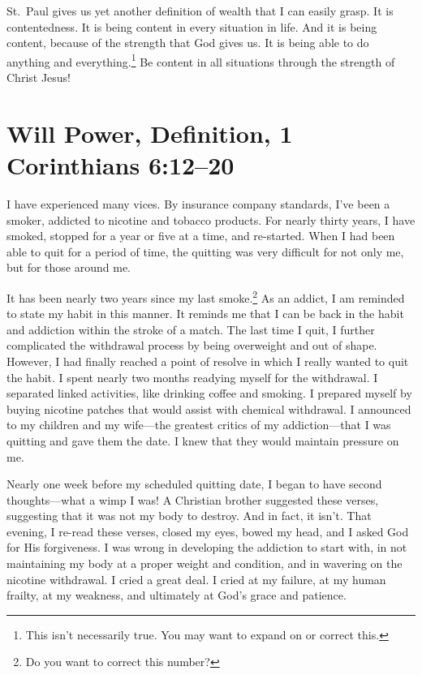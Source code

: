 \documentclass[12pt]{memoir}
\begin{document}
St.~Paul gives us yet another definition of wealth that I can easily
grasp. It is contentedness. It is being content in every situation
in life. And it is being content, because of the strength that God
gives us. It is being able to do anything and everything.\footnote{This isn't necessarily true. You may want to expand on or correct this.} Be content in all situations through the strength of Christ Jesus!

\section[Will Power]{Will Power, Definition, 1 Corinthians 6:12--20}

I have experienced many vices. By insurance company standards, I've
been a smoker, addicted to nicotine and tobacco products. For nearly
thirty years, I have smoked, stopped for a year or five at a time,
and re-started. When I had been able to quit for a period of time,
the quitting was very difficult for not only me, but for those around
me. 

It has been nearly two years since my last smoke.\footnote{Do you want to correct this number?} As an addict, I am
reminded to state my habit in this manner. It reminds me that I can
be back in the habit and addiction within the stroke of a match. The
last time I quit, I further complicated the withdrawal process by
being overweight and out of shape. However, I had finally reached
a point of resolve in which I really wanted to quit the habit. I spent
nearly two months readying myself for the withdrawal. I separated
linked activities, like drinking coffee and smoking. I prepared myself
by buying nicotine patches that would assist with chemical withdrawal.
I announced to my children and my wife---the greatest critics of my
addiction---that I was quitting and gave them the date. I knew that
they would maintain pressure on me. 

Nearly one week before my scheduled quitting date, I began to have
second thoughts---what a wimp I was! A Christian brother suggested
these verses, suggesting that it was not my body to destroy. And in fact, it isn't. That evening, I re-read these verses, closed my eyes, bowed
my head, and I asked God for His forgiveness. I was wrong in developing
the addiction to start with, in not maintaining my body at a proper
weight and condition, and in wavering on the nicotine withdrawal.
I cried a great deal. I cried at my failure, at my human frailty,
at my weakness, and ultimately at God's grace and patience.
\end{document}

